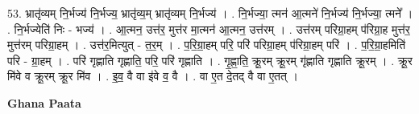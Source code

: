 \documentclass[17pt]{extarticle}
\begin{document}
53. भ्रातृ॑व्यम् नि॒र्भज्य॑ नि॒र्भज्य॒ भ्रातृ॑व्य॒म् भ्रातृ॑व्यम् नि॒र्भज्य॑ । . नि॒र्भज्या॒ त्मन॑ आ॒त्मने॑ नि॒र्भज्य॑ नि॒र्भज्या॒ त्मने᳚ । . नि॒र्भज्येति॑ निः - भज्य॑ । . आ॒त्मन॒ उत्त॑र॒ मुत्त॑र मा॒त्मन॑ आ॒त्मन॒ उत्त॑रम् । . उत्त॑रम् परिग्रा॒हम् प॑रिग्रा॒ह मुत्त॑र॒ मुत्त॑रम् परिग्रा॒हम् । . उत्त॑र॒मित्युत् - त॒र॒म् । . प॒रि॒ग्रा॒हम् परि॒ परि॑ परिग्रा॒हम् प॑रिग्रा॒हम् परि॑ । . प॒रि॒ग्रा॒हमिति॑ परि - ग्रा॒हम् । . परि॑ गृह्णाति गृह्णाति॒ परि॒ परि॑ गृह्णाति । . गृ॒ह्णा॒ति॒ क्रू॒रम् क्रू॒रम् गृ॑ह्णाति गृह्णाति क्रू॒रम् । . क्रू॒र मि॑वे व क्रू॒रम् क्रू॒र मि॑व । . इ॒व॒ वै वा इ॑वे व॒ वै । . वा ए॒त दे॒तद् वै वा ए॒तत् । \newline

\textbf{Ghana Paata } \newline
\end{document}

